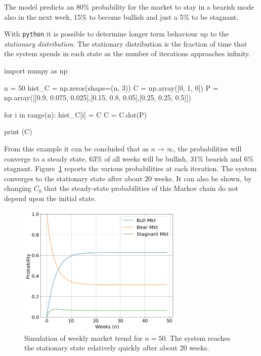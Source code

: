 The model predicts an 80\% probability for the market to stay in a bearish mode also in the next week, 15\% to become bullish and just a 5\% to be stagnant.

With \texttt{python} it is possible to determine longer term behaviour up to the \emph{stationary distribution}. The stationary distribution is the fraction of time that the system spends in each state as the number of iterations approaches infinity.

\begin{ipython}
import numpy as np

n = 50
hist_C = np.zeros(shape=(n, 3))
C = np.array([0, 1, 0])
P = np.array([[0.9, 0.075, 0.025],[0.15, 0.8, 0.05],[0.25, 0.25, 0.5]])

for i in range(n):
    hist_C[i] = C
    C = C.dot(P)

print (C)
\end{ipython}
\begin{ioutput}
[0.62499979 0.31250019 0.06250002]
\end{ioutput}

From this example it can be concluded that as $n \rightarrow \infty$, the probabilities will converge to a steady state, 63\% of all weeks will be bullish, 31\% bearish and 6\% stagnant. Figure~\ref{fig:markov_chain_sim} reports the various probabilities at each iteration. The system converges to the stationary state after about 20 weeks.
It can also be shown, by changing $C_0$ that the steady-state probabilities of this Markov chain do not depend upon the initial state. 

\begin{figure}[!t]
	\centering
	\includegraphics[width=0.7\textwidth]{figures/markov_chain_sim}
	\caption{Simulation of weekly market trend for $n=50$. The system reaches the stationary state relatively quickly after about 20 weeks.}
	\label{fig:markov_chain_sim}
\end{figure}


